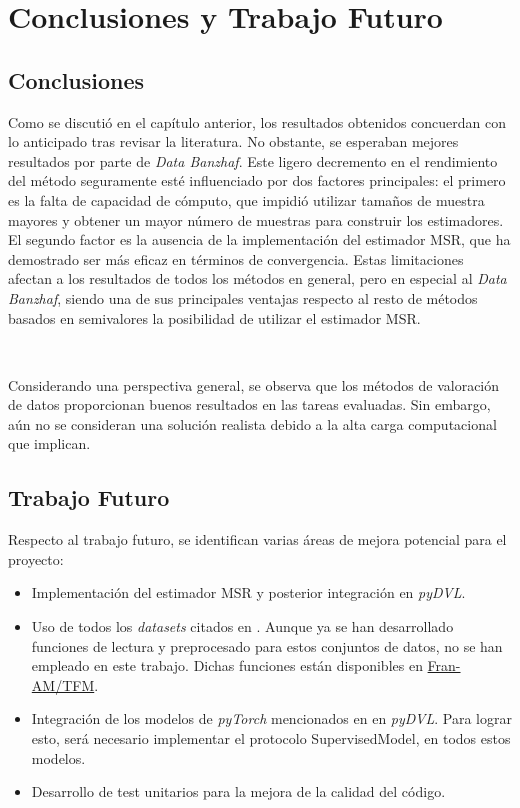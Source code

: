 \chapter{Conclusiones y Trabajo Futuro}
\justifying
\section*{Conclusiones}
Como se discutió en el capítulo anterior, los resultados obtenidos
concuerdan con lo anticipado tras revisar la literatura. No obstante,
se esperaban mejores resultados por parte de \textit{Data Banzhaf}.
Este ligero decremento en el rendimiento del método seguramente
esté influenciado por dos factores principales: el primero
es la falta de capacidad de cómputo, que impidió utilizar tamaños
de muestra mayores y obtener un mayor número de muestras para
construir los estimadores. El segundo factor es la ausencia de
la implementación del estimador MSR, que ha demostrado ser
más eficaz en términos de convergencia. Estas limitaciones afectan
a los resultados de todos los métodos en general, pero en especial
al \textit{Data Banzhaf}, siendo una de sus principales ventajas
respecto al resto de métodos basados en semivalores la posibilidad
de utilizar el estimador MSR.

\

Considerando una perspectiva general, se observa que los métodos
de valoración de datos proporcionan buenos resultados en las
tareas evaluadas. Sin embargo, aún no se consideran una
solución realista debido a la alta carga computacional que implican.

\section*{Trabajo Futuro}
Respecto al trabajo futuro, se identifican varias áreas de
mejora potencial para el proyecto:
\begin{itemize}
    \item Implementación del estimador MSR y posterior integración
    en \textit{pyDVL}.
    \item Uso de todos los \textit{datasets}
    citados en \cite{dataBanzhaf}. Aunque ya se han
    desarrollado funciones de lectura y preprocesado
    para estos conjuntos de datos, no se han empleado
    en este trabajo. Dichas funciones están disponibles
    en \href{https://github.com/Fran-AM/TFM}{Fran-AM/TFM}.
    \item Integración de los modelos de \textit{pyTorch}
    mencionados en \cite{dataBanzhaf} en \textit{pyDVL}.
    Para lograr esto, será necesario implementar el
    protocolo SupervisedModel, en todos estos modelos.
    \item Desarrollo de test unitarios para la mejora
    de la calidad del código.
\end{itemize}

